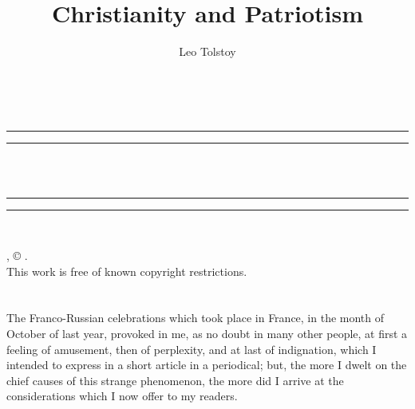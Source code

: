\documentclass{book}
\date{}
\title{Christianity and Patriotism}
\author{Leo Tolstoy}
\begin{document}
\thispagestyle{empty}
\begin{center}
	{\Huge \@title   \\[5mm]}
\end{center}
\newpage
\thispagestyle{empty}
\cleardoublepage
\begin{center}
	\thispagestyle{empty}
	\vspace*{\baselineskip}
	\rule{\textwidth}{1.6pt}\vspace*{-\baselineskip}\vspace*{2pt}
	\rule{\textwidth}{0.4pt}\\[\baselineskip]
	{\Huge\scshape \@title   \\[5mm]}
	{\Large }
	\rule{\textwidth}{0.4pt}\vspace*{-\baselineskip}\vspace{3.2pt}
	\rule{\textwidth}{1.6pt}\\[\baselineskip]
	\vspace*{4\baselineskip}
	{\Large \@author}
	\vfill
\end{center}
\pagebreak
\newpage
\thispagestyle{empty}
\null\vfill
\noindent
\begin{center}
	{\emph{\@title}, © \@author.\\[5mm]}
	{This work is free of known copyright restrictions.\\[5mm]}
\end{center}
\pagebreak
\newpage
\setcounter{tocdepth}{0}
\setcounter{secnumdepth}{0}

\chapter*{}\label{chapter-0}
The Franco-Russian celebrations which took place in France, in the month of October of last year, provoked in me, as no doubt in many other people, at first a feeling of amusement, then of perplexity, and at last of indignation, which I intended to express in a short article in a periodical; but, the more I dwelt on the chief causes of this strange phenomenon, the more did I arrive at the considerations which I now offer to my readers.
\end{document}
